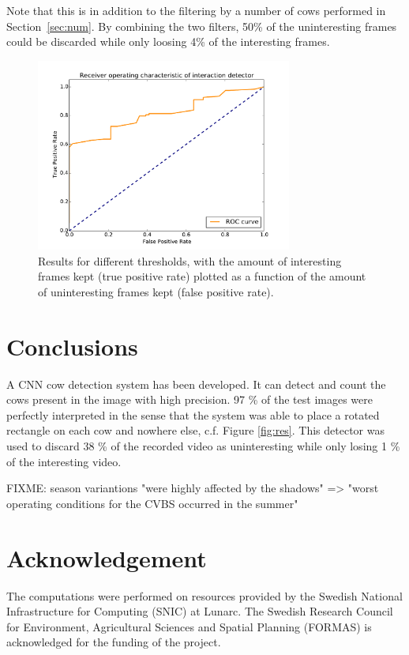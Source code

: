 \documentclass{IET}
\begin{document}
Note that this is in addition to the filtering by a number of cows performed in Section~\ref{sec:num}. By combining the two filters, 50\% of the uninteresting frames could be discarded while only loosing 4\% of the interesting frames.

\begin{figure}[tb]
\begin{center}
  \includegraphics[width=0.75\textwidth]{roc.pdf}
\end{center}
  \caption{Results for different thresholds, with the amount of interesting frames kept (true positive rate) plotted as a function of the amount of uninteresting frames kept (false positive rate).}
  \label{fig:roc}
\end{figure}


\section{Conclusions}
A CNN cow detection system has been developed. It can detect and count the cows present in the image with high precision. 97 \% of the test images were perfectly interpreted in the sense that the system was able to place a rotated rectangle on each cow and nowhere else, c.f. Figure \ref{fig:res}. This detector was used to discard 38 \% of the recorded video as uninteresting while only losing 1 \% of the interesting video.

FIXME: season variantions
"were highly affected by the shadows" => "worst operating
conditions for the CVBS occurred in the summer"


\section{Acknowledgement}
The computations were performed on resources provided by the Swedish National Infrastructure for Computing (SNIC) at Lunarc. The Swedish Research Council for Environment, Agricultural Sciences and 
Spatial Planning (FORMAS) is acknowledged 
for the funding of the project.




{\parindent0pt
\parskip8pt

}
\end{document}
